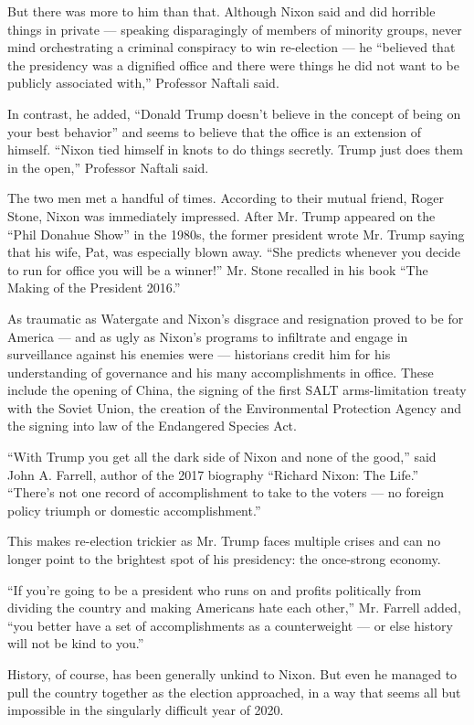 But there was more to him than that. Although Nixon said and did
horrible things in private --- speaking disparagingly of members of
minority groups, never mind orchestrating a criminal conspiracy to win
re-election --- he ``believed that the presidency was a dignified office
and there were things he did not want to be publicly associated with,''
Professor Naftali said.

In contrast, he added, ``Donald Trump doesn't believe in the concept of
being on your best behavior'' and seems to believe that the office is an
extension of himself. ``Nixon tied himself in knots to do things
secretly. Trump just does them in the open,'' Professor Naftali said.

The two men met a handful of times. According to their mutual friend,
Roger Stone, Nixon was immediately impressed. After Mr. Trump appeared
on the ``Phil Donahue Show'' in the 1980s, the former president wrote
Mr. Trump saying that his wife, Pat, was especially blown away. ``She
predicts whenever you decide to run for office you will be a winner!''
Mr. Stone recalled in his book ``The Making of the President 2016.''

As traumatic as Watergate and Nixon's disgrace and resignation proved to
be for America --- and as ugly as Nixon's programs to infiltrate and
engage in surveillance against his enemies were --- historians credit
him for his understanding of governance and his many accomplishments in
office. These include the opening of China, the signing of the first
SALT arms-limitation treaty with the Soviet Union, the creation of the
Environmental Protection Agency and the signing into law of the
Endangered Species Act.

``With Trump you get all the dark side of Nixon and none of the good,''
said John A. Farrell, author of the 2017 biography ``Richard Nixon: The
Life.'' ``There's not one record of accomplishment to take to the voters
--- no foreign policy triumph or domestic accomplishment.''

This makes re-election trickier as Mr. Trump faces multiple crises and
can no longer point to the brightest spot of his presidency: the
once-strong economy.

``If you're going to be a president who runs on and profits politically
from dividing the country and making Americans hate each other,'' Mr.
Farrell added, ``you better have a set of accomplishments as a
counterweight --- or else history will not be kind to you.''

History, of course, has been generally unkind to Nixon. But even he
managed to pull the country together as the election approached, in a
way that seems all but impossible in the singularly difficult year of
2020.

